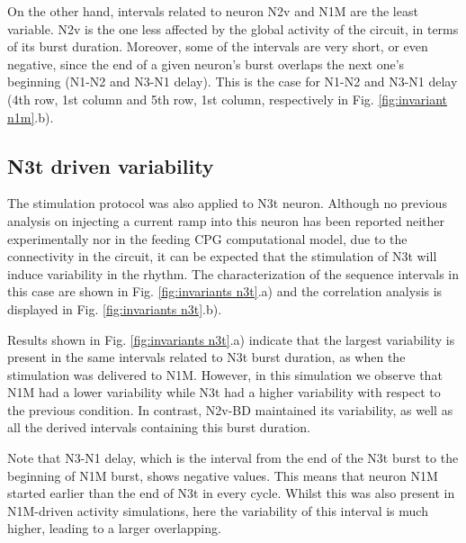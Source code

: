 On the other hand, intervals related to neuron N2v and N1M are the least variable. N2v is the one less affected by the global activity of the circuit, in terms of its burst duration. Moreover, some of the intervals are very short, or even negative, since the end of a given neuron's burst overlaps the next one's beginning (N1-N2 and N3-N1 delay). This is the case for N1-N2 and N3-N1 delay (4th row, 1st column and 5th row, 1st column, respectively in Fig. \ref{fig:invariant n1m}.b).  




\subsection{N3t driven variability}
\label{subsec:n3t driven}

The stimulation protocol was also applied to N3t neuron. Although no previous analysis on injecting a current ramp into this neuron has been reported neither experimentally nor in the feeding CPG computational model, due to the connectivity in the circuit, it can be expected that the stimulation of N3t will induce variability in the rhythm. The characterization of the sequence intervals in this case are shown in Fig. 
\ref{fig:invariants n3t}.a) and the correlation analysis is displayed in Fig. \ref{fig:invariants n3t}.b).


Results shown in Fig. \ref{fig:invariants n3t}.a) indicate that the largest variability is present in the same intervals related to N3t burst duration, as when the stimulation was delivered to N1M. However, in this simulation we observe that N1M had a lower variability while N3t had a higher variability with respect to the previous condition. 
In contrast, N2v-BD maintained its variability, as well as all the derived intervals containing this burst duration.

Note that N3-N1 delay, which is the interval from the end of the N3t burst to the beginning of N1M burst, shows negative values. This means that neuron N1M started earlier than the end of N3t in every cycle. Whilst this was also present in N1M-driven activity simulations, here the variability of this interval is much higher, leading to a larger overlapping.

